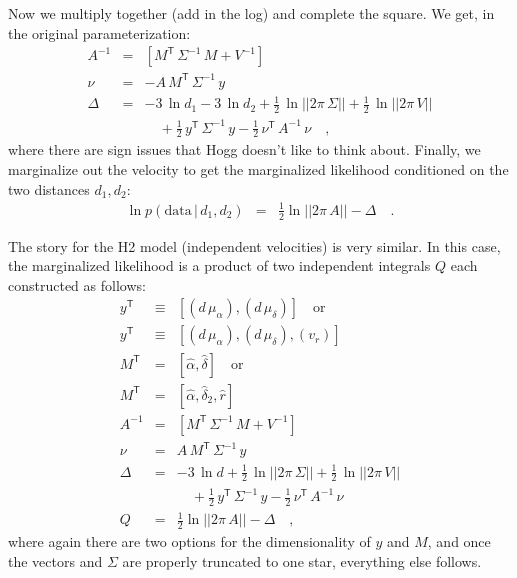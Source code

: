 \documentclass[manuscript, letterpaper]{aastex6}
\newcommand{\given}{\,|\,}
\newcommand{\transp}[1]{{#1}^{\!\mathsf{T}}}
\newcommand{\inv}[1]{{#1}^{-1}}
\newcommand{\data}{\mathrm{data}}
\begin{document}
Now we multiply together (add in the log) and complete the square.
We get, in the original parameterization:
\begin{eqnarray}
  \inv{A} &=& [\transp{M}\,\inv{\Sigma}\,M+\inv{V}]
  \\
  \nu &=& -A\,\transp{M}\,\inv{\Sigma}\,y
  \\
  \Delta &=& -3\,\ln d_1 -3\,\ln d_2
  +\frac{1}{2}\,\ln||2\pi\,\Sigma|| +\frac{1}{2}\,\ln||2\pi\,V|| \nonumber \\ && \quad
  +\frac{1}{2}\,\transp{y}\,\inv{\Sigma}\,y -\frac{1}{2}\,\transp{\nu}\,\inv{A}\,\nu
  \quad ,
\end{eqnarray}
where there are sign issues that Hogg doesn't like to think about.
Finally, we marginalize out the velocity to get the marginalized
likelihood conditioned on the two distances $d_1, d_2$:
\begin{eqnarray}
  \ln p(\data\given d_1,d_2)
  &=& \frac{1}{2}\ln ||2\pi\,A|| -\Delta
  \quad .
\end{eqnarray}

The story for the H2 model (independent velocities) is very
similar. In this case, the marginalized likelihood is a product of
two independent integrals $Q$ each constructed as follows:
\begin{eqnarray}
  \transp{y} &\equiv& [(d\,\mu_{\alpha}), (d\,\mu_{\delta})] \quad \mbox{or}
  \\
  \transp{y} &\equiv& [(d\,\mu_{\alpha}), (d\,\mu_{\delta}), (v_{r})]
  \\
  \transp{M} &=& [\hat{\alpha}, \hat{\delta}] \quad \mbox{or}
  \\
  \transp{M} &=& [\hat{\alpha}, \hat{\delta}_2, \hat{r}]
  \\
  \inv{A} &=& [\transp{M}\,\inv{\Sigma}\,M+\inv{V}]
  \\
  \nu &=& A\,\transp{M}\,\inv{\Sigma}\,y
  \\
  \Delta &=& -3\,\ln d
  +\frac{1}{2}\,\ln||2\pi\,\Sigma|| +\frac{1}{2}\,\ln||2\pi\,V|| \nonumber \\ && \quad
  +\frac{1}{2}\,\transp{y}\,\inv{\Sigma}\,y -\frac{1}{2}\,\transp{\nu}\,\inv{A}\,\nu
  \\
  Q &=& \frac{1}{2}\ln ||2\pi\,A|| -\Delta
  \quad ,
\end{eqnarray}
where again there are two options for the dimensionality of $y$ and
$M$, and once the vectors and $\Sigma$ are properly truncated to one
star, everything else follows.
\end{document}
